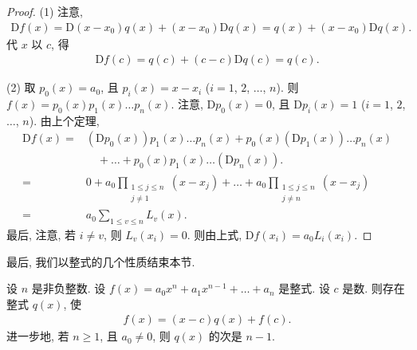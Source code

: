 \documentclass[../libro.tex]{subfiles}
\begin{document}
\begin{proof}
    (1)
    注意,
    \begin{align*}
        \mathrm{D} f(x)
        = \mathrm{D} (x - x_0) q(x) + (x - x_0) \mathrm{D} q(x)
        = q(x) + (x - x_0) \mathrm{D} q(x).
    \end{align*}
    代 \(x\) 以 \(c\), 得
    \begin{align*}
        \mathrm{D} f(c)
        = q(c) + (c - c) \mathrm{D} q(c)
        = q(c).
    \end{align*}

    (2)
    取 \(p_0 (x) = a_0\),
    且 \(p_i (x) = x - x_i\)
    (\(i = 1\), \(2\), \(\dots\), \(n\)).
    则 \(f(x) = p_0 (x) p_1 (x) \dots p_n (x)\).
    注意, \(\mathrm{D} p_0 (x) = 0\),
    且 \(\mathrm{D} p_i (x) = 1\)
    (\(i = 1\), \(2\), \(\dots\), \(n\)).
    由上个定理,
    \begin{align*}
        \mathrm{D} f(x)
        = {} &
        (\mathrm{D} p_0 (x)) p_1 (x) \dots p_n (x)
        + p_0 (x) (\mathrm{D} p_1 (x)) \dots p_n (x)
        \\
        &
        \quad
        + \dots
        + p_0 (x) p_1 (x) \dots (\mathrm{D} p_n (x)).
        \\
        = {} &
        0
        + a_0 \prod_{\substack{1 \leq j \leq n \\ j \neq 1}}
        {(x - x_j)}
        + \dots
        + a_0 \prod_{\substack{1 \leq j \leq n \\ j \neq n}}
        {(x - x_j)}
        \\
        = {} &
        a_0 \sum_{1 \leq v \leq n} {L_v (x)}.
    \end{align*}
    最后, 注意, 若 \(i \neq v\), 则 \(L_v (x_i) = 0\).
    则由上式, \(\mathrm{D} f(x_i) = a_0 L_i (x_i)\).
\end{proof}

最后, 我们以整式的几个性质结束本节.

\begin{theorem}
    设 \(n\) 是非负整数.
    设 \(f(x) = a_0 x^n + a_1 x^{n-1} + \dots + a_n\) 是整式.
    设 \(c\) 是数.
    则存在整式 \(q(x)\), 使
    \begin{align*}
        f(x) = (x - c) q(x) + f(c).
    \end{align*}
    进一步地, 若 \(n \geq 1\), 且 \(a_0 \neq 0\),
    则 \(q(x)\) 的次是 \(n-1\).
\end{theorem}
\end{document}
